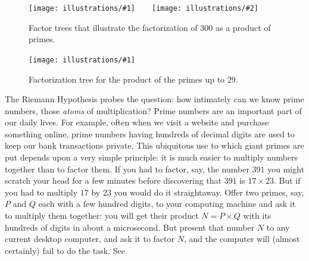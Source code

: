 \documentclass[openany]{book}
\newcommand{\ill}[3]{%
   \begin{figure}[H]%
   \vspace{-2ex}
   \centering%
   \texttt{[image: illustrations/\#1]}%
   \caption{#3}%
   \vspace{-2ex}
    \end{figure}}
\newcommand{\illtwo}[4]{%
   \begin{figure}[H]\centering%
   \texttt{[image: illustrations/\#1]}$\qquad$\texttt{[image: illustrations/\#2]}%
   \caption{#4}%
    \end{figure}}
\theoremstyle{plain}
\theoremstyle{definition}
\newcommand{\RH}{Riemann Hypothesis\index{Riemann Hypothesis}}
\begin{document}
\illtwo{factor_tree_300_a}{factor_tree_300_b}{.47}
{Factor trees that illustrate the factorization of 300 as a product of primes.\label{fig:factor300}}

\ill{factor_tree_big}{1}{Factorization tree for the product of the primes up to $29$.\label{factor.tree.big}}%


The \RH{} probes the question: how intimately can we know
prime numbers, those {\em atoms} of multiplication?  Prime numbers are
an important part of our daily lives.  For example, often when we visit a
website and purchase something online, prime numbers having hundreds of
decimal digits are used to keep our bank transactions private.  This
ubiquitous use to which giant primes are put depends upon a very
simple principle: it is much easier to multiply numbers together than
to factor them. If you had to factor, say, the number $391$ you might
scratch your head for a few minutes before discovering that $391$ is
$17\times 23$. But if you had to multiply $17$ by $23$ you would do it
straightaway.  Offer two primes, say, $P$ and $Q$ each with a few hundred
digits, to your computing machine and ask it to multiply them
together: you will get their product $N = P\times Q$ with its hundreds of digits
in about a microsecond. But present that number $N$ to any
current desktop computer, and ask it to factor $N$, and the computer
will (almost certainly) fail to do the task. See
\end{document}
